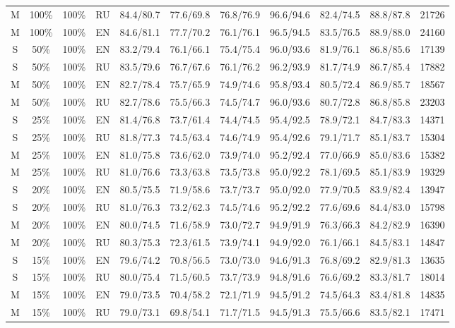 \begin{table*}
{\begin{tabular}{|c|c|c|c||c|c|c|c|c|c||c|}
M & 100\% & 100\% & RU & 84.4/80.7 & 77.6/69.8 & 76.8/76.9 & 96.6/94.6 & 82.4/74.5 & 88.8/87.8 & 21726 \\ 
 M  &  100\%  &  100\%  &  EN  & 84.6/81.1 & 77.7/70.2 & 76.1/76.1 & 96.5/94.5 & 83.5/76.5 & 88.9/88.0 & 24160 \\ \hline
  S  &  50\%  &  100\%  &  EN  & 83.2/79.4 & 76.1/66.1 & 75.4/75.4 & 96.0/93.6 & 81.9/76.1 & 86.8/85.6 & 17139 \\ 
 S & 50\% & 100\% & RU & 83.5/79.6 & 76.7/67.6 & 76.1/76.2 & 96.2/93.9 & 81.7/74.9 & 86.7/85.4 & 17882 \\
 M  &  50\%  &  100\%  &  EN  & 82.7/78.4 & 75.7/65.9 & 74.9/74.6 & 95.8/93.4 & 80.5/72.4 & 86.9/85.7 & 18567 \\ 
M & 50\% & 100\% & RU & 82.7/78.6 & 75.5/66.3 & 74.5/74.7 & 96.0/93.6 & 80.7/72.8 & 86.8/85.8 & 23203 \\ \hline 
 S  &  25\%  &  100\%  &  EN  & 81.4/76.8 & 73.7/61.4 & 74.4/74.5 & 95.4/92.5 & 78.9/72.1 & 84.7/83.3 & 14371 \\ 
S & 25\% & 100\% & RU & 81.8/77.3 & 74.5/63.4 & 74.6/74.9 & 95.4/92.6 & 79.1/71.7 & 85.1/83.7 & 15304 \\
 M  &  25\%  &  100\%  &  EN  & 81.0/75.8 & 73.6/62.0 & 73.9/74.0 & 95.2/92.4 & 77.0/66.9 & 85.0/83.6 & 15382 \\ 
M & 25\% & 100\% & RU & 81.0/76.6 & 73.3/63.8 & 73.5/73.8 & 95.0/92.2 & 78.1/69.5 & 85.1/83.9 & 19329 \\ \hline 
 S  &  20\%  &  100\%  &  EN  & 80.5/75.5 & 71.9/58.6 & 73.7/73.7 & 95.0/92.0 & 77.9/70.5 & 83.9/82.4 & 13947 \\ 
S & 20\% & 100\% & RU & 81.0/76.3 & 73.2/62.3 & 74.5/74.6 & 95.2/92.2 & 77.6/69.6 & 84.4/83.0 & 15798 \\
 M  &  20\%  &  100\%  &  EN  & 80.0/74.5 & 71.6/58.9 & 73.0/72.7 & 94.9/91.9 & 76.3/66.3 & 84.2/82.9 & 16390 \\ 
M & 20\% & 100\% & RU & 80.3/75.3 & 72.3/61.5 & 73.9/74.1 & 94.9/92.0 & 76.1/66.1 & 84.5/83.1 & 14847 \\ \hline
 S  &  15\%  &  100\%  &  EN  & 79.6/74.2 & 70.8/56.5 & 73.0/73.0 & 94.6/91.3 & 76.8/69.2 & 82.9/81.3 & 13635 \\ 
S & 15\% & 100\% & RU & 80.0/75.4 & 71.5/60.5 & 73.7/73.9 & 94.8/91.6 & 76.6/69.2 & 83.3/81.7 & 18014 \\
 M  &  15\%  &  100\%  &  EN  & 79.0/73.5 & 70.4/58.2 & 72.1/71.9 & 94.5/91.2 & 74.5/64.3 & 83.4/81.8 & 14835 \\ 
M & 15\% & 100\% & RU & 79.0/73.1 & 69.8/54.1 & 71.7/71.5 & 94.5/91.3 & 75.5/66.6 & 83.5/82.1 & 17471 \\ \hline

\end{tabular}}
\end{table*}
